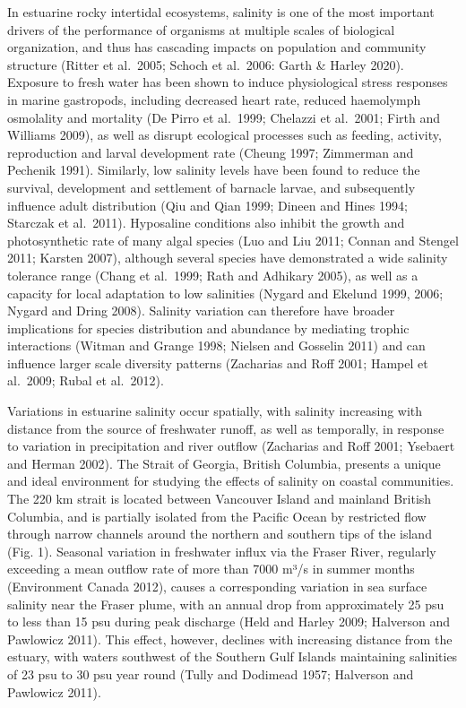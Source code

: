 \documentclass[
  11pt,
]{article}
\begin{document}
In estuarine rocky intertidal ecosystems, salinity is one of the most important drivers of the performance of organisms at multiple scales of biological organization, and thus has cascading impacts on population and community structure (Ritter et al.~2005; Schoch et al.~2006: Garth \& Harley 2020). Exposure to fresh water has been shown to induce physiological stress responses in marine gastropods, including decreased heart rate, reduced haemolymph osmolality and mortality (De Pirro et al.~1999; Chelazzi et al.~2001; Firth and Williams 2009), as well as disrupt ecological processes such as feeding, activity, reproduction and larval development rate (Cheung 1997; Zimmerman and Pechenik 1991). Similarly, low salinity levels have been found to reduce the survival, development and settlement of barnacle larvae, and subsequently influence adult distribution (Qiu and Qian 1999; Dineen and Hines 1994; Starczak et al.~2011). Hyposaline conditions also inhibit the growth and photosynthetic rate of many algal species (Luo and Liu 2011; Connan and Stengel 2011; Karsten 2007), although several species have demonstrated a wide salinity tolerance range (Chang et al.~1999; Rath and Adhikary 2005), as well as a capacity for local adaptation to low salinities (Nygard and Ekelund 1999, 2006; Nygard and Dring 2008). Salinity variation can therefore have broader implications for species distribution and abundance by mediating trophic interactions (Witman and Grange 1998; Nielsen and Gosselin 2011) and can influence larger scale diversity patterns (Zacharias and Roff 2001; Hampel et al.~2009; Rubal et al.~2012).

Variations in estuarine salinity occur spatially, with salinity increasing with distance from the source of freshwater runoff, as well as temporally, in response to variation in precipitation and river outflow (Zacharias and Roff 2001; Ysebaert and Herman 2002). The Strait of Georgia, British Columbia, presents a unique and ideal environment for studying the effects of salinity on coastal communities. The 220 km strait is located between Vancouver Island and mainland British Columbia, and is partially isolated from the Pacific Ocean by restricted flow through narrow channels around the northern and southern tips of the island (Fig. 1). Seasonal variation in freshwater influx via the Fraser River, regularly exceeding a mean outflow rate of more than 7000 m³/s in summer months (Environment Canada 2012), causes a corresponding variation in sea surface salinity near the Fraser plume, with an annual drop from approximately 25 psu to less than 15 psu during peak discharge (Held and Harley 2009; Halverson and Pawlowicz 2011). This effect, however, declines with increasing distance from the estuary, with waters southwest of the Southern Gulf Islands maintaining salinities of 23 psu to 30 psu year round (Tully and Dodimead 1957; Halverson and Pawlowicz 2011).
\end{document}
